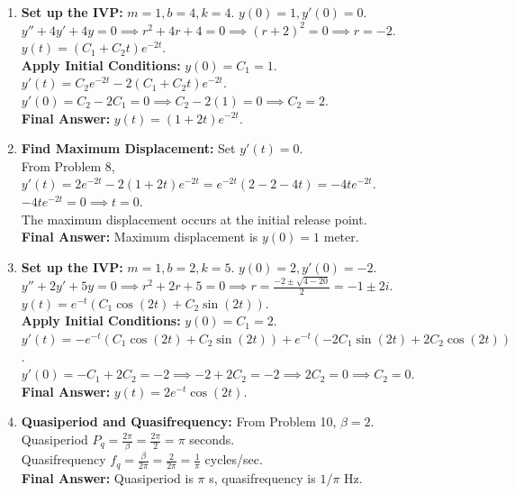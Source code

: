 \documentclass[11pt]{article}
\begin{document}
\begin{enumerate}[label=\textbf{\arabic*.}]
    \item \textbf{Set up the IVP:} $m=1, b=4, k=4$. $y(0) = 1, y'(0) = 0$. \\
    $y'' + 4y' + 4y = 0 \implies r^2 + 4r + 4 = 0 \implies (r+2)^2 = 0 \implies r = -2$. \\
    $y(t) = (C_1 + C_2 t)e^{-2t}$. \\
    \textbf{Apply Initial Conditions:} $y(0) = C_1 = 1$. \\
    $y'(t) = C_2 e^{-2t} - 2(C_1 + C_2 t)e^{-2t}$. \\
    $y'(0) = C_2 - 2C_1 = 0 \implies C_2 - 2(1) = 0 \implies C_2 = 2$. \\
    \textbf{Final Answer:} $y(t) = (1 + 2t)e^{-2t}$.

    \item \textbf{Find Maximum Displacement:} Set $y'(t) = 0$. \\
    From Problem 8, $y'(t) = 2e^{-2t} - 2(1 + 2t)e^{-2t} = e^{-2t}(2 - 2 - 4t) = -4te^{-2t}$. \\
    $-4te^{-2t} = 0 \implies t = 0$. \\
    The maximum displacement occurs at the initial release point. \\
    \textbf{Final Answer:} Maximum displacement is $y(0) = 1$ meter.

    \item \textbf{Set up the IVP:} $m=1, b=2, k=5$. $y(0) = 2, y'(0) = -2$. \\
    $y'' + 2y' + 5y = 0 \implies r^2 + 2r + 5 = 0 \implies r = \frac{-2 \pm \sqrt{4 - 20}}{2} = -1 \pm 2i$. \\
    $y(t) = e^{-t}(C_1 \cos(2t) + C_2 \sin(2t))$. \\
    \textbf{Apply Initial Conditions:} $y(0) = C_1 = 2$. \\
    $y'(t) = -e^{-t}(C_1 \cos(2t) + C_2 \sin(2t)) + e^{-t}(-2C_1 \sin(2t) + 2C_2 \cos(2t))$. \\
    $y'(0) = -C_1 + 2C_2 = -2 \implies -2 + 2C_2 = -2 \implies 2C_2 = 0 \implies C_2 = 0$. \\
    \textbf{Final Answer:} $y(t) = 2e^{-t}\cos(2t)$.

    \item \textbf{Quasiperiod and Quasifrequency:} From Problem 10, $\beta = 2$. \\
    Quasiperiod $P_q = \frac{2\pi}{\beta} = \frac{2\pi}{2} = \pi$ seconds. \\
    Quasifrequency $f_q = \frac{\beta}{2\pi} = \frac{2}{2\pi} = \frac{1}{\pi}$ cycles/sec. \\
    \textbf{Final Answer:} Quasiperiod is $\pi$ s, quasifrequency is $1/\pi$ Hz.


\end{enumerate}
\end{document}
